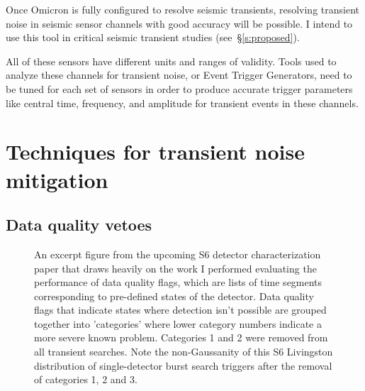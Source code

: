 Once Omicron is fully configured to resolve seismic transients, resolving transient noise in seismic sensor channels with good accuracy will be possible. I intend to use this tool in critical seismic transient studies (see~\S\ref{s:proposed}). 

All of these sensors have different units and ranges of validity. Tools used to analyze these channels for transient noise, or Event Trigger Generators, need to be tuned for each set of sensors in order to produce accurate trigger parameters like central time, frequency, and amplitude for transient events in these channels. 

\section{Techniques for transient noise mitigation}

%
\subsection{Data quality vetoes}

\begin{figure}[htb]
	\caption{\label{fig:S6DQ} An excerpt figure from the upcoming S6 detector characterization paper that draws heavily on the work I performed evaluating the performance of data quality flags, which are lists of time segments corresponding to pre-defined states of the detector. Data quality flags that indicate states where detection isn't possible are grouped together into 'categories' where lower category numbers indicate a more severe known problem. Categories 1 and 2 were removed from all transient \gw{} searches. Note the non-Gaussanity of this S6 Livingston distribution of single-detector burst search triggers after the removal of categories 1, 2 and 3.}
\end{figure}


